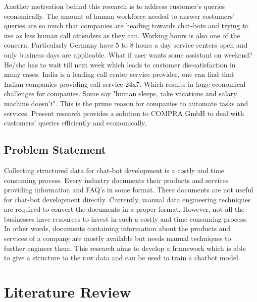 \documentclass[a4paper,12pt]{article}
\begin{document}
Another motivation behind this research is to address customer's  queries economically. The amount of human workforce needed to answer costumers' queries are so much that companies are heading towards chat-bots and trying to use as less human call attenders as they can. Working hours is also one of the concern. Particularly Germany have 5 to 8 hours a day service centers open and only business days are applicable. What if user wants some assistant on weekend? He/she has to wait till next week which leads to customer dis-satisfaction in many cases. India is a leading call center service provider, one can find that Indian companies providing call service 24x7. Which results in huge economical challenges for companies. Some say "human sleeps, take vacations and salary machine doesn't". This is the prime reason for companies to automate tasks and services. Present research provides a solution to COMPRA GmbH to deal with customers' queries efficiently and economically.


  

\newpage

\subsection{Problem Statement}
Collecting structured data for chat-bot development is a costly and time consuming process. Every industry documents their products and services providing information and FAQ's in some format. These documents are not useful for chat-bot development directly. Currently, manual data engineering techniques are required to convert the documents in a proper format. However, not all the businesses have resources to invest in such a costly and time consuming process. In other words, documents containing information about the products and services of a company are mostly available but needs manual techniques to  further engineer them. This research aims to develop a framework which is able to give a structure to the raw data and can be used to train a chatbot model. 



\section{Literature Review}
\end{document}
